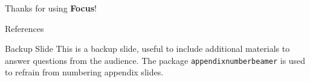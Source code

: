 \documentclass{beamer}
\begin{document}

\begin{frame}[focus]
	Thanks for using \textbf{Focus}!
\end{frame}


\appendix

\begin{frame}{References}
	\nocite{*} %
	
	
\end{frame}


\begin{frame}{Backup Slide}
	This is a backup slide, useful to include additional materials to answer questions from the audience.
	\vfill
	The package \texttt{appendixnumberbeamer} is used to refrain from numbering appendix slides.
\end{frame}

\end{document}
